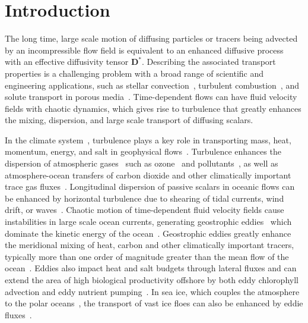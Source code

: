 \documentclass[amsa]{ipart}
\begin{document}
\section{Introduction}\label{sec:Introduction}
The long time, large scale motion of diffusing particles or
tracers being advected by an incompressible flow field is equivalent
to an enhanced diffusive process~\cite{Taylor:PRSL:196} with an
effective diffusivity tensor $\mathbf{D}^*$. Describing the associated
transport properties is a challenging problem with a broad range of
scientific and engineering applications, such as stellar
convection~\cite{Knobloch:1992ApJ,Press:1981:ApJ,canut98,canut98b,canut00},
turbulent
combustion~\cite{Aslanyan:BF00790149,Bilger:05:10.1016,Tabaczynski:1990:243},
and solute transport in porous
media~\cite{Bhattacharya:AAP:1999:951,Bhattacharya:1989:ASD,Whitaker:AIC690130308,Gupta:WRCR3940,Koch:1988:965,Lester:PRL:111.174101,Koch:JFM:7961001}.
Time-dependent flows can have fluid velocity fields with chaotic
dynamics, which gives rise to turbulence that greatly enhances the
mixing, dispersion, and large scale transport of diffusing scalars.   



In the climate
system~\cite{Csanady:1973:9789027702609,Griffies:2003:10.1007},
turbulence plays a key role in transporting mass, heat, momentum,
energy, and salt in geophysical
flows~\cite{Moffatt:RPP:621}. Turbulence enhances the dispersion of
atmospheric gases~\cite{Espinosa:MET1292} such as
ozone~\cite{Holton:JGRC2495,Pitari:JGR:1986,Plumb:JAS:1979,Plumb:JAS:1987}
and
pollutants~\cite{Bilger:10.1175,Beychok:1994:9780964458802,Samson:1988:88009978},
as well as atmosphere-ocean transfers of carbon dioxide and other
climatically important trace gas
fluxes~\cite{Zappa:2007:67613,Banerjee:10.1007}.  Longitudinal
dispersion of passive scalars in oceanic flows can be enhanced by
horizontal turbulence due to shearing of tidal currents, wind drift,
or
waves~\cite{Young:JPO:1982:515,Kullenberg:1972:TUS1529,Bowden:JFM:1965}.   
Chaotic motion of 
time-dependent fluid velocity fields cause instabilities in large
scale ocean currents, generating geostrophic
eddies~\cite{Ferrari:JPO:1501} which dominate the kinetic energy of
the ocean~\cite{Ferrari:ARFM:253}. Geostrophic
eddies greatly enhance~\cite{Ferrari:JPO:1501} the meridional mixing
of heat, carbon and other climatically important tracers, typically
more than one order of magnitude greater than the mean flow of the
ocean~\cite{Souza:OS:317}. Eddies also impact heat and salt budgets
through lateral fluxes and can extend the area of high biological
productivity offshore by both eddy chlorophyll advection and eddy
nutrient pumping~\cite{Chaigneau:JGR:C11025}. In sea ice, which
couples the atmosphere to the polar
oceans~\cite{Washington:1986:9780935702521}, the transport of vast ice
floes can also be enhanced by eddie
fluxes~\cite{Watanabe:2009JPO4010,Lukovich:Sea_ice_dynamics}. 
\end{document}
